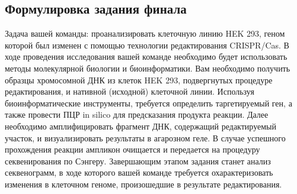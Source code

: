 \subsection*{Формулировка задания финала}

Задача вашей команды:  проанализировать клеточную линию HEK 293, геном которой был изменен с помощью технологии редактирования CRISPR/Cas.
В ходе проведения исследования вашей команде необходимо будет использовать методы молекулярной биологии и биоинформатики.
Вам необходимо получить образцы хромосомной ДНК из клеток HEK 293, подвергнутых процедуре редактирования, и нативной (исходной) клеточной линии. Используя биоинформатические инструменты, требуется определить таргетируемый ген, а также провести ПЦР in silico для предсказания продукта реакции. Далее необходимо амплифицировать фрагмент ДНК, содержащий редактируемый участок, и визуализировать результаты в агарозном геле. В случае успешного прохождения реакции ампликон очищается и передается на процедуру секвенирования по Сэнгеру. Завершающим этапом задания станет анализ секвенограмм, в ходе которого вашей команде требуется охарактеризовать изменения в клеточном геноме, произошедшие в результате редактирования.

